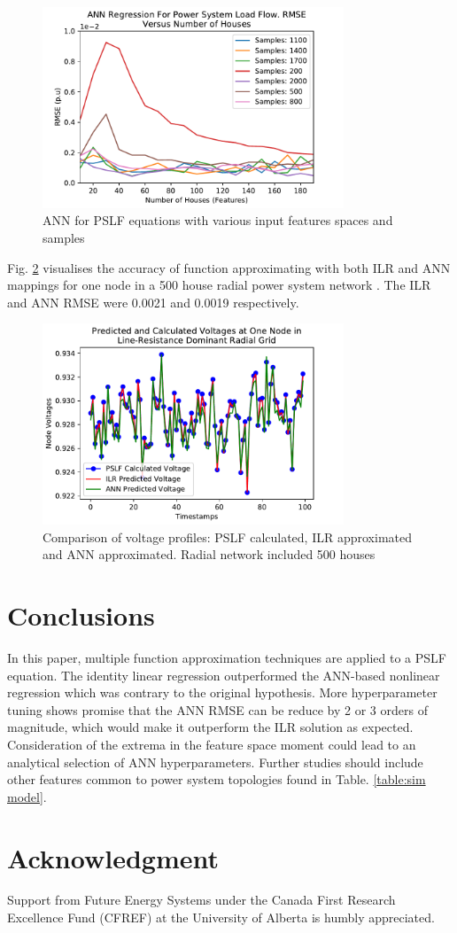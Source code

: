 \documentclass[conference]{IEEEtran}
\begin{document}
\begin{figure}[h]
	\centering
	\includegraphics[width=9cm]{annrmsevsfeatures_familyofcurves.pdf}
	\caption{ANN for PSLF equations with various input features spaces and samples}
	\label{fig:annresults}
\end{figure}

Fig. \ref{fig:comparison} visualises the accuracy of function approximating with both ILR and ANN mappings for one node in a 500 house radial power system network	. The ILR and ANN RMSE were 0.0021 and 0.0019 respectively.

\begin{figure}[h]
	\centering
	\includegraphics[width=9cm]{comparingvoltages_500.pdf}
	\caption{Comparison of voltage profiles: PSLF calculated, ILR approximated and ANN approximated. Radial network included 500 houses}
	\label{fig:comparison}
\end{figure}

\section{Conclusions}
\label{sec:conc}
In this paper, multiple function approximation techniques are applied to a PSLF equation. The identity linear regression outperformed the ANN-based nonlinear regression which was contrary to the original hypothesis. More hyperparameter tuning shows promise that the ANN RMSE can be reduce by 2 or 3 orders of magnitude, which would make it outperform the ILR solution as expected. Consideration of the extrema in the feature space moment could lead to an analytical selection of ANN hyperparameters. Further studies should include other features common to power system topologies found in Table. \ref{table:sim model}.

\section*{Acknowledgment}
Support from Future Energy Systems under the Canada First Research Excellence Fund (CFREF) at the University of Alberta is humbly appreciated.




\end{document}
